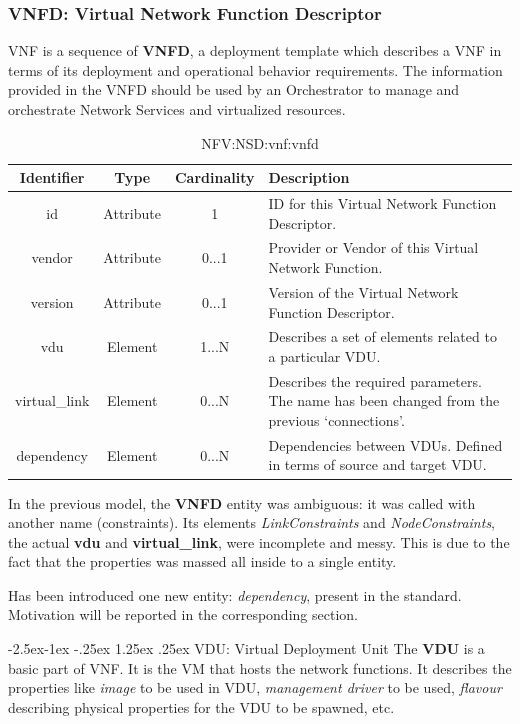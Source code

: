 \documentclass[11pt, english]{article}
\makeatletter
\renewcommand\paragraph{\@startsection{paragraph}{4}{\z@}%
            {-2.5ex\@plus -1ex \@minus -.25ex}%
            {1.25ex \@plus .25ex}%
            {\normalfont\normalsize\bfseries}}
\makeatother
\begin{document}
\subsubsection{VNFD: Virtual Network Function Descriptor}
VNF is a sequence of \textbf{VNFD}, a deployment template which describes a VNF in terms of its deployment and operational behavior requirements. The information provided in the VNFD should be used by an Orchestrator to manage and orchestrate Network Services and virtualized resources.

\begin{table}[ht]
    \centering
    \begin{tabular}{c|c|c|m{7cm}}
    \hline
    Identifier & Type & Cardinality & Description \\
    \hline
    \rowcolor{Gray}
    id & Attribute & 1 & ID for this Virtual Network Function Descriptor. \\
    \hline
    vendor & Attribute & 0...1 & Provider or Vendor of this Virtual Network Function. \\
    \hline
    \rowcolor{Gray}
    version & Attribute & 0...1 & Version of the Virtual Network Function Descriptor. \\
    \hline
    vdu & Element & 1...N & Describes a set of elements related to a particular VDU. \\
    \hline
    \rowcolor{Gray}
    virtual\_link & Element & 0...N & Describes the required parameters. The name has been changed from the previous ‘connections’. \\
    \hline
    dependency & Element & 0...N & Dependencies between VDUs. Defined in terms of source and target VDU. \\
    \hline
    \end{tabular}
    \caption{NFV:NSD:vnf:vnfd} \label{tab:tab7}
\end{table}

In the previous model, the \textbf{VNFD} entity was ambiguous: it was called with another name (constraints). 
Its elements \textit{LinkConstraints} and \textit{NodeConstraints}, the actual \textbf{vdu} and \textbf{virtual\_link}, were incomplete and messy. This is due to the fact that the properties was massed all inside to a single entity.

Has been introduced one new entity: \textit{dependency}, present in the standard. Motivation will be reported in the corresponding section. 

\newpage
\paragraph{VDU: Virtual Deployment Unit}
The \textbf{VDU} is a basic part of VNF. It is the VM that hosts the network functions. It describes the properties like \emph{image} to be used in VDU, \emph{management driver} to be used, \emph{flavour} describing physical properties for the VDU to be spawned, etc.
\end{document}
